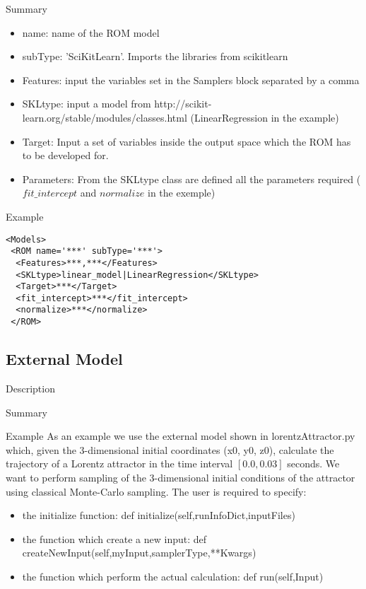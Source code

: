 Summary 
\begin{itemize}
\item name: name of the ROM model
\item subType: 'SciKitLearn'. Imports the libraries from scikitlearn
\item Features: input the variables set in the Samplers block separated by a comma
\item SKLtype: input a model from http://scikit-learn.org/stable/modules/classes.html (LinearRegression in the example)
\item Target: Input a set of variables inside the output space which the ROM has to be developed for. 
\item Parameters: From the SKLtype class are defined all the parameters required ($fit\_intercept$ and $normalize$ in the exemple) 
\end{itemize}

Example

\begin{lstlisting}[style=XML]
<Models>
 <ROM name='***' subType='***'>
  <Features>***,***</Features>
  <SKLtype>linear_model|LinearRegression</SKLtype>
  <Target>***</Target>
  <fit_intercept>***</fit_intercept>
  <normalize>***</normalize>
 </ROM>
\end{lstlisting}




\subsection{External Model}
\label{subsec:models_externalModel}

Description

Summary

Example
As an example we use the external model shown in lorentzAttractor.py which, given the 3-dimensional initial coordinates (x0, y0, z0), calculate the trajectory of a Lorentz attractor in the time interval $[0.0,0.03]$ seconds.
We want to perform sampling of the 3-dimensional initial conditions of the attractor using classical Monte-Carlo sampling.
The user is required to specify:
\begin{itemize}
\item the initialize function: def initialize(self,runInfoDict,inputFiles)
\item the function which create a new input: def createNewInput(self,myInput,samplerType,**Kwargs)
\item the function which perform the actual calculation: def run(self,Input)
\end{itemize}

